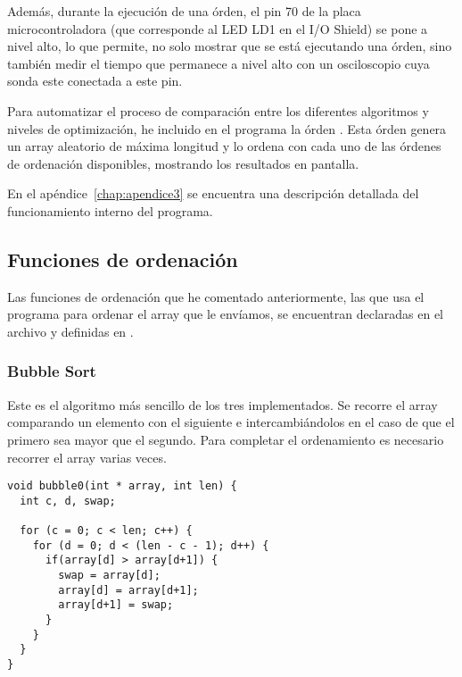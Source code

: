 Además, durante la ejecución de una órden, el pin 70 de la placa microcontroladora (que corresponde al LED LD1 en el I/O Shield) se pone a nivel alto, lo que permite, no solo mostrar que se está ejecutando una órden, sino también medir el tiempo que permanece a nivel alto con un osciloscopio cuya sonda este conectada a este pin. 

Para automatizar el proceso de comparación entre los diferentes algoritmos y niveles de optimización, he incluido en el programa la órden . Esta órden genera un array aleatorio de máxima longitud y lo ordena con cada uno de las órdenes de ordenación disponibles, mostrando los resultados en pantalla.

En el apéndice~\ref{chap:apendice3} se encuentra una descripción detallada del funcionamiento interno del programa.

\subsection{Funciones de ordenación}
Las funciones de ordenación que he comentado anteriormente, las que usa el programa para ordenar el array que le envíamos, se encuentran declaradas en el archivo  y definidas en .

\subsubsection{Bubble Sort}
Este es el algoritmo más sencillo de los tres implementados. Se recorre el array comparando un elemento con el siguiente e intercambiándolos en el caso de que el primero sea mayor que el segundo. Para completar el ordenamiento es necesario recorrer el array varias veces.
\begin{lstlisting}[caption=Implementación de Bubble Sort]
void bubble0(int * array, int len) {
  int c, d, swap;

  for (c = 0; c < len; c++) {
    for (d = 0; d < (len - c - 1); d++) {
      if(array[d] > array[d+1]) {
        swap = array[d];
        array[d] = array[d+1];
        array[d+1] = swap;
      }
    }
  }
}  
\end{lstlisting}\label{Implementación de Bubble Sort en nuestro programa}

